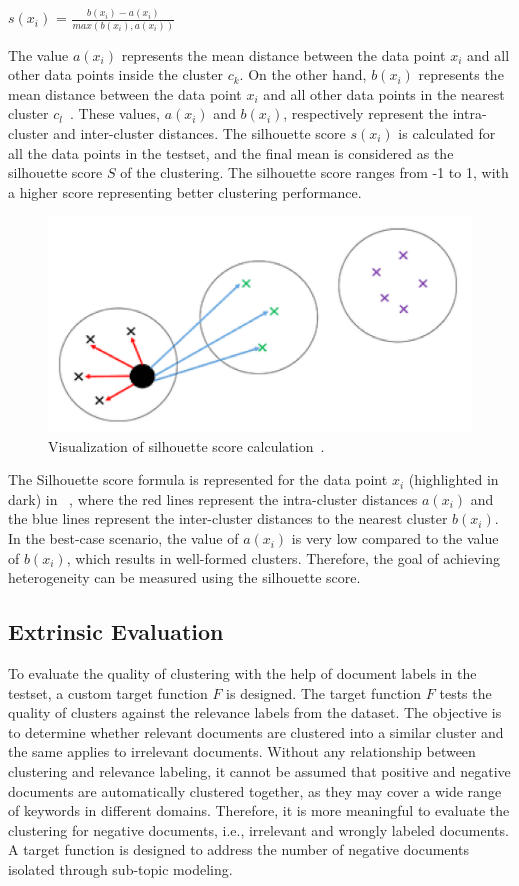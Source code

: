 		\centerline{$s(x_i)$ = $\frac{b(x_i) - a(x_i)}{max(b(x_i), a(x_i))} $}
		
The value $a(x_i)$ represents the mean distance between the data point $x_i$ and all other data points inside the cluster $c_k$. On the other hand, $b(x_i)$ represents the mean distance between the data point $x_i$ and all other data points in the nearest cluster $c_l$~\cite{shutaywi2021silhouette}. These values, $a(x_i)$ and $b(x_i)$, respectively represent the intra-cluster and inter-cluster distances. The silhouette score $s(x_i)$ is calculated for all the data points in the testset, and the final mean is considered as the silhouette score $S$ of the clustering. The silhouette score ranges from -1 to 1, with a higher score representing better clustering performance.

		
		\begin{figure}[h]
			\centering
			\includegraphics[width=.7\textwidth]{images/papers/silhouette_index.png}
			\caption[Visualization of silhouette score calculation]{Visualization of silhouette score calculation~\cite{shutaywi2021silhouette}.  \label{fig:silhouette_index}}
		\end{figure}
	
The Silhouette score formula is represented for the data point $x_i$ (highlighted in dark) in ~, where the red lines represent the intra-cluster distances $a(x_i)$ and the blue lines represent the inter-cluster distances to the nearest cluster $b(x_i)$. In the best-case scenario, the value of $a(x_i)$ is very low compared to the value of $b(x_i)$, which results in well-formed clusters. Therefore, the goal of achieving heterogeneity can be measured using the silhouette score.

	
		\subsection{Extrinsic Evaluation} To evaluate the quality of clustering with the help of document labels in the testset, a custom target function $F$ is designed. The target function $F$ tests the quality of clusters against the relevance labels from the dataset. The objective is to determine whether relevant documents are clustered into a similar cluster and the same applies to irrelevant documents. Without any relationship between clustering and relevance labeling, it cannot be assumed that positive and negative documents are automatically clustered together, as they may cover a wide range of keywords in different domains. Therefore, it is more meaningful to evaluate the clustering for negative documents, i.e., irrelevant and wrongly labeled documents. A target function is designed to address the number of negative documents isolated through sub-topic modeling.
		
